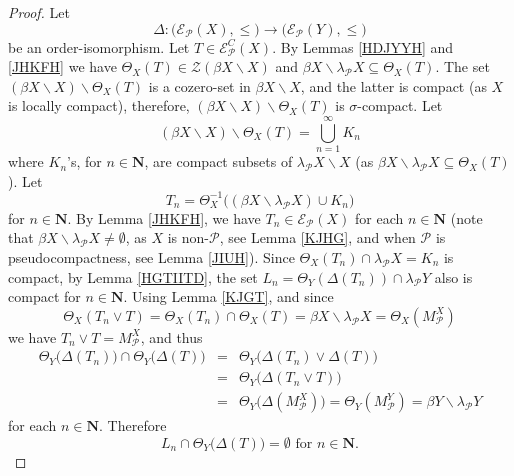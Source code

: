 \documentclass{amsart}
\theoremstyle{definition}
\theoremstyle{remark}
\theoremstyle{notation}
\numberwithin{equation}{section}
\begin{document}
\begin{proof}
Let
\[\Delta:\big({\mathscr E}_{{\mathcal P}}(X),\leq\big)\rightarrow\big({\mathscr E}_{{\mathcal P}}(Y),\leq\big)\]
be an  order-isomorphism. Let $T\in{\mathscr E}^C_{{\mathcal P}}(X)$. By Lemmas  \ref{HDJYYH} and  \ref{JHKFH} we have
$\Theta_X(T)\in {\mathscr Z}(\beta X\backslash X)$ and $\beta X\backslash\lambda_{{\mathcal P}} X\subseteq \Theta_X(T)$. The set
$(\beta X\backslash X)\backslash \Theta_X(T)$ is a cozero-set in  $\beta X\backslash X$, and the latter is compact (as $X$ is locally compact), therefore, $(\beta X\backslash X)\backslash \Theta_X(T)$  is $\sigma$-compact. Let
\begin{equation}\label{HFSD}
(\beta X\backslash X)\backslash\Theta_X(T)=\bigcup_{n=1}^\infty K_n
\end{equation}
where $K_n$'s, for $n\in \mathbf{N}$, are compact subsets of
$\lambda_{{\mathcal P}} X\backslash X$ (as $\beta X\backslash\lambda_{{\mathcal P}} X\subseteq \Theta_X(T)$). Let
\begin{equation}\label{JKGDF}
T_n=\Theta_X^{-1}\big((\beta X\backslash\lambda_{{\mathcal P}} X)\cup K_n\big)
\end{equation}
for $n\in \mathbf{N}$. By Lemma \ref{JHKFH}, we have  $T_n\in{\mathscr E}_{{\mathcal P}}(X)$ for each $n\in \mathbf{N}$ (note that $\beta X\backslash\lambda_{{\mathcal P}} X\neq\emptyset$, as  $X$ is non-${\mathcal P}$, see Lemma \ref{KJHG}, and when  ${\mathcal P}$ is pseudocompactness,
see Lemma \ref{JIUH}). Since $\Theta_X(T_n)\cap\lambda_{{\mathcal P}} X=K_n$ is compact, by Lemma \ref{HGTIITD}, the set
$L_n=\Theta_Y(\Delta(T_n))\cap\lambda_{{\mathcal P}} Y$ also is compact for $n\in \mathbf{N}$.
Using Lemma \ref{KJGT}, and since
\[\Theta_X(T_n\vee T)=\Theta_X(T_n)\cap\Theta_X(T)=\beta X\backslash\lambda_{{\mathcal P}} X=\Theta_X(M^X_{{\mathcal P}})\]
we have $T_n\vee T=M^X_{{\mathcal P}}$, and thus
\begin{eqnarray*}
\Theta_Y\big(\Delta(T_n)\big)\cap\Theta_Y\big(\Delta(T)\big)&=&\Theta_Y\big(\Delta(T_n)\vee \Delta(T)\big)\\&=&\Theta_Y\big(\Delta(T_n\vee T)\big)\\&=&\Theta_Y\big(\Delta(M^X_{{\mathcal P}})\big)
=\Theta_Y(M^Y_{{\mathcal P}})=\beta Y\backslash\lambda_{{\mathcal P}} Y
\end{eqnarray*}
for each $n\in \mathbf{N}$. Therefore
\begin{equation}\label{JHGF}
L_n\cap \Theta_Y\big(\Delta(T)\big)=\emptyset\mbox{ for }n\in \mathbf{N}.
\end{equation}

\end{proof}
\end{document}

